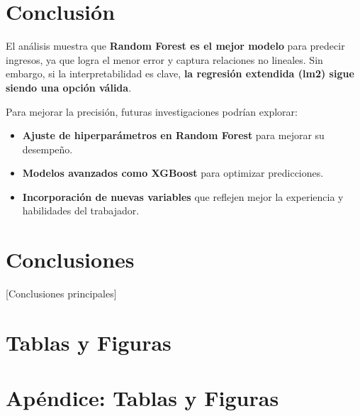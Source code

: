 \documentclass[12pt,a4paper,onecolumn]{article}
\begin{document}
\section{Conclusión}
El análisis muestra que \textbf{Random Forest es el mejor modelo} para predecir ingresos, ya que logra el menor error y captura relaciones no lineales. Sin embargo, si la interpretabilidad es clave, \textbf{la regresión extendida (lm2) sigue siendo una opción válida}.

Para mejorar la precisión, futuras investigaciones podrían explorar:
\begin{itemize}
    \item \textbf{Ajuste de hiperparámetros en Random Forest} para mejorar su desempeño.
    \item \textbf{Modelos avanzados como XGBoost} para optimizar predicciones.
    \item \textbf{Incorporación de nuevas variables} que reflejen mejor la experiencia y habilidades del trabajador.
\end{itemize}

\section{Conclusiones}
[Conclusiones principales]


\pagebreak
\singlespacing

\pagebreak

\section*{Tablas y Figuras}


\pagebreak

\appendix
\renewcommand{\theequation}{\Alph{chapter}.\arabic{equation}}

\setcounter{figure}{0}
\setcounter{table}{0}
\makeatletter 
\renewcommand{\thefigure}{A.\@arabic\c@figure}
\renewcommand{\thetable}{A.\@arabic\c@table}

\section{Apéndice: Tablas y Figuras}\label{sec:appendix_tables} 
\end{document}
